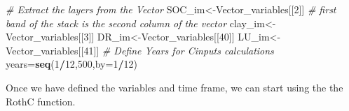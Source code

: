 \documentclass[
  10pt,
  b5paper,
]{book}
\newenvironment{Shaded}{\begin{snugshade}}{\end{snugshade}}
\newcommand{\CommentTok}[1]{\textcolor[rgb]{0.56,0.35,0.01}{\textit{#1}}}
\newcommand{\DataTypeTok}[1]{\textcolor[rgb]{0.13,0.29,0.53}{#1}}
\newcommand{\DecValTok}[1]{\textcolor[rgb]{0.00,0.00,0.81}{#1}}
\newcommand{\KeywordTok}[1]{\textcolor[rgb]{0.13,0.29,0.53}{\textbf{#1}}}
\newcommand{\NormalTok}[1]{#1}
\newcommand{\OperatorTok}[1]{\textcolor[rgb]{0.81,0.36,0.00}{\textbf{#1}}}
\begin{document}
\begin{Shaded}
\begin{Highlighting}[]
\CommentTok{# Extract the layers from the Vector}
\NormalTok{SOC_im<-Vector_variables[[}\DecValTok{2}\NormalTok{]] }\CommentTok{# first band of the stack is the second column of the vector}
\NormalTok{clay_im<-Vector_variables[[}\DecValTok{3}\NormalTok{]]}
\NormalTok{DR_im<-Vector_variables[[}\DecValTok{40}\NormalTok{]]}
\NormalTok{LU_im<-Vector_variables[[}\DecValTok{41}\NormalTok{]]}
\CommentTok{# Define Years for Cinputs calculations}
\NormalTok{years=}\KeywordTok{seq}\NormalTok{(}\DecValTok{1}\OperatorTok{/}\DecValTok{12}\NormalTok{,}\DecValTok{500}\NormalTok{,}\DataTypeTok{by=}\DecValTok{1}\OperatorTok{/}\DecValTok{12}\NormalTok{)}
\end{Highlighting}
\end{Shaded}

Once we have defined the variables and time frame, we can start using the the RothC function.
\end{document}
